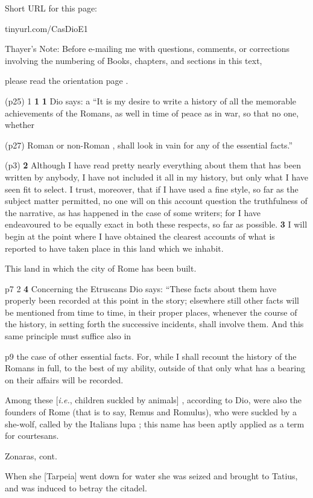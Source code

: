 
Short URL for this page:

tinyurl.com/CasDioE1

Thayer's Note: Before e-mailing me with questions, comments, or corrections involving the numbering of Books, chapters, and sections in this text,

please read the orientation page .

(p25)
1 \textbf{1} \textbf{1} Dio says:\texthebrew{⁠} a ``It is my desire to write a history of all the memorable achievements of the Romans, as well in time of peace as in war, so that no one, whether

(p27) Roman or non-Roman , shall look in vain for any of the essential facts.''

(p3)
\textbf{2}
Although I have read pretty nearly everything about them that has been written by anybody, I have not included it all in my history, but only what I have seen fit to select. I trust, moreover, that if I have used a fine style, so far as the subject matter permitted, no one will on this account question the truthfulness of the narrative, as has happened in the case of some writers; for I have endeavoured to be equally exact in both these respects, so far as possible. \textbf{3} I will begin at the point where I have obtained the clearest accounts of what is reported to have taken place in this land which we inhabit.

This land in which the city of Rome has been built.

p7
2 \textbf{4} Concerning the Etruscans Dio says: ``These facts about them have properly been recorded at this point in the story; elsewhere still other facts will be mentioned from time to time, in their proper places, whenever the course of the history, in setting forth the successive incidents, shall involve them. And this same principle must suffice also in

p9 the case of other essential facts. For, while I shall recount the history of the Romans in full, to the best of my ability, outside of that only what has a bearing on their affairs will be recorded.

Among these [\emph{i.e.}, children suckled by animals] , according to Dio, were also the founders of Rome (that is to say, Remus and Romulus), who were suckled by a she-wolf, called by the Italians lupa ; this name has been aptly applied as a term for courtesans.

Zonaras, cont.

When she [Tarpeia] went down for water she was seized and brought to Tatius, and was induced to betray the citadel.

